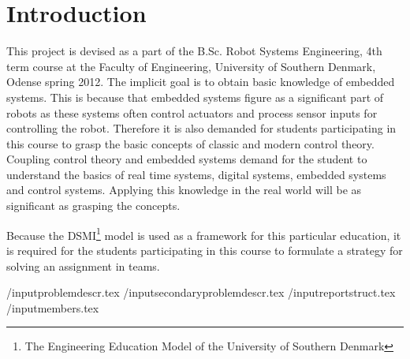 \chapter{Introduction}\label{chap:intro}

This project is devised as a part of the B.Sc. Robot Systems Engineering, 4th term course at the Faculty of Engineering, University of Southern Denmark, Odense spring 2012. The implicit goal is to obtain basic knowledge of embedded systems. This is because that embedded systems figure as a significant part of robots as these systems often control actuators and process sensor inputs for controlling the robot. Therefore it is also demanded for students participating in this course to grasp the basic concepts of classic and modern control theory. Coupling control theory and embedded systems demand for the student to understand the basics of real time systems, digital systems, embedded systems and control systems. Applying this knowledge in the real world will be as significant as grasping the concepts.

Because the DSMI\footnote{The Engineering Education Model of the University of Southern Denmark} model is used as a framework for this particular education, it is required for the students participating in this course to formulate a strategy for solving an assignment in teams.

/input{problemdescr.tex}
/input{secondaryproblemdescr.tex}
/input{reportstruct.tex}
/input{members.tex}